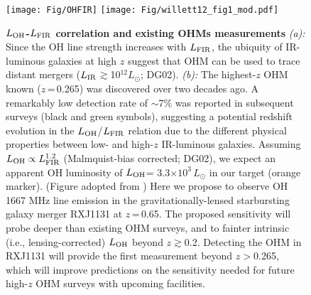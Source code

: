 \documentclass[letterpaper,11pt]{article}
\newcommand{\Lsun}{\mbox{$L_{\odot}$}\xspace}
\newcommand{\LFIR}{\mbox{$L_{\rm FIR}$}\xspace}
\newcommand{\LOH}{$L_{\rm OH}$\xspace}
\newcommand{\E}[1]{\mbox{$\times10^{#1}$}}
\newcommand{\eq}{\,=\,}
\begin{document}
\begin{figure}[ptbh]
\texttt{[image: Fig/OHFIR]} \hspace{-1.25em}
\texttt{[image: Fig/willett12\_fig1\_mod.pdf]}
\caption{{\bf \LOH-\LFIR correlation and existing OHMs measurements}
{\it (a):} Since the OH line strength increases with \LFIR,
the ubiquity of IR-luminous galaxies at high $z$ suggest that OHM can be used to trace distant mergers
($L_{\rm IR}$$\gtrsim$10$^{12}$\Lsun; DG02).
{\it (b):} The highest-$z$ OHM known ($z$\eq0.265) was discovered over two decades ago.
A remarkably low detection rate of $\sim$7\% was reported in subsequent surveys (black and green symbols),
suggesting a potential redshift evolution in the \LOH/\LFIR relation
due to the different physical properties between low- and high-$z$ IR-luminous galaxies.
Assuming $L_{\rm OH}\propto L_{\rm FIR}^{1.2}$ (Malmquist-bias corrected; DG02),
we expect an apparent OH luminosity of \LOH= 3.3\E{3}\,\Lsun in our target (orange marker). (Figure adopted from
\citealt{Willett12a})
Here we propose to observe OH 1667 MHz line emission in the gravitationally-lensed starbursting
galaxy merger RXJ1131 at $z$\eq0.65.
The proposed sensitivity will
probe deeper than existing OHM surveys, and to fainter intrinsic (i.e., lensing-corrected) \LOH beyond $z$$\gtrsim$0.2.
Detecting the OHM in RXJ1131 will provide the first measurement beyond $z$$>$0.265,
which will improve predictions on the sensitivity needed for future high-$z$ OHM surveys with upcoming facilities.
\label{fig:model}}
\end{figure}
\end{document}
